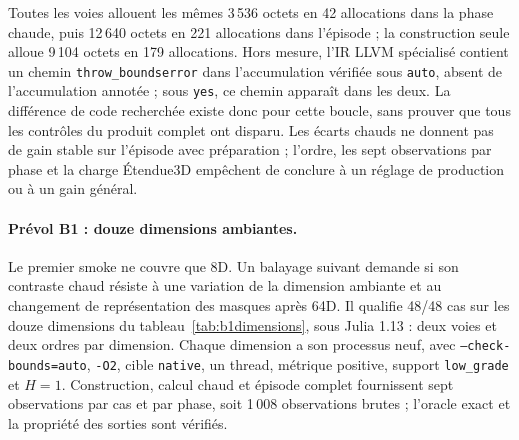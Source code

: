 \documentclass[11pt,a4paper]{article}
\newcommand{\code}[1]{\texttt{#1}}
\begin{document}
Toutes les voies allouent les mêmes 3\,536 octets en 42 allocations dans la
phase chaude, puis 12\,640 octets en 221 allocations dans l'épisode ; la
construction seule alloue 9\,104 octets en 179 allocations. Hors mesure,
l'IR LLVM spécialisé contient un chemin \code{throw\_boundserror} dans
l'accumulation vérifiée sous \code{auto}, absent de l'accumulation
annotée ; sous \code{yes}, ce chemin apparaît dans les deux. La
différence de code recherchée existe donc pour cette boucle, sans prouver
que tous les contrôles du produit complet ont disparu. Les écarts chauds
ne donnent pas de gain stable sur l'épisode avec préparation ; l'ordre,
les sept observations par phase et la charge Étendue3D empêchent de
conclure à un réglage de production ou à un gain général.

\paragraph{Prévol B1 : douze dimensions ambiantes.}
Le premier smoke ne couvre que 8D. Un balayage suivant demande si son
contraste chaud résiste à une variation de la dimension ambiante et au
changement de représentation des masques après 64D. Il qualifie 48/48 cas
sur les douze dimensions du tableau~\ref{tab:b1dimensions}, sous Julia 1.13 :
deux voies et deux ordres par dimension. Chaque dimension a son processus
neuf, avec \code{--check-bounds=auto}, \code{-O2}, cible \code{native},
un thread, métrique positive, support \code{low\_grade} et $H=1$.
Construction, calcul chaud et épisode complet fournissent sept
observations par cas et par phase, soit 1\,008 observations brutes ;
l'oracle exact et la propriété des sorties sont vérifiés.
\end{document}
